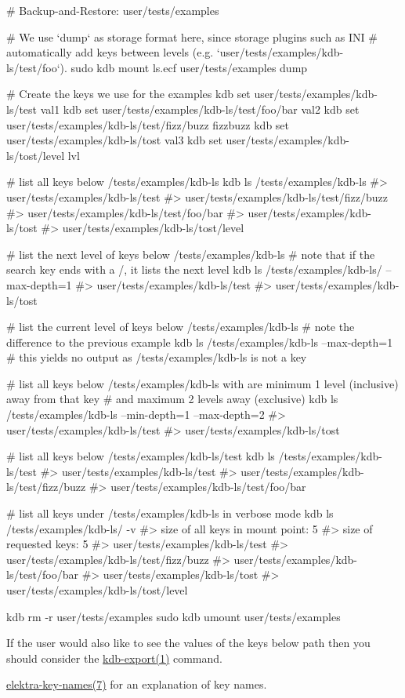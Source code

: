 \begin{DoxyCode}
# Backup-and-Restore: user/tests/examples

# We use `dump` as storage format here, since storage plugins such as INI
# automatically add keys between levels (e.g. `user/tests/examples/kdb-ls/test/foo`).
sudo kdb mount ls.ecf user/tests/examples dump

# Create the keys we use for the examples
kdb set user/tests/examples/kdb-ls/test val1
kdb set user/tests/examples/kdb-ls/test/foo/bar val2
kdb set user/tests/examples/kdb-ls/test/fizz/buzz fizzbuzz
kdb set user/tests/examples/kdb-ls/tost val3
kdb set user/tests/examples/kdb-ls/tost/level lvl

# list all keys below /tests/examples/kdb-ls
kdb ls /tests/examples/kdb-ls
#> user/tests/examples/kdb-ls/test
#> user/tests/examples/kdb-ls/test/fizz/buzz
#> user/tests/examples/kdb-ls/test/foo/bar
#> user/tests/examples/kdb-ls/tost
#> user/tests/examples/kdb-ls/tost/level

# list the next level of keys below /tests/examples/kdb-ls
# note that if the search key ends with a /, it lists the next level
kdb ls /tests/examples/kdb-ls/ --max-depth=1
#> user/tests/examples/kdb-ls/test
#> user/tests/examples/kdb-ls/tost

# list the current level of keys below /tests/examples/kdb-ls
# note the difference to the previous example
kdb ls /tests/examples/kdb-ls --max-depth=1
# this yields no output as /tests/examples/kdb-ls is not a key

# list all keys below /tests/examples/kdb-ls with are minimum 1 level (inclusive) away from that key
# and maximum 2 levels away (exclusive)
kdb ls /tests/examples/kdb-ls --min-depth=1 --max-depth=2
#> user/tests/examples/kdb-ls/test
#> user/tests/examples/kdb-ls/tost

# list all keys below /tests/examples/kdb-ls/test
kdb ls /tests/examples/kdb-ls/test
#> user/tests/examples/kdb-ls/test
#> user/tests/examples/kdb-ls/test/fizz/buzz
#> user/tests/examples/kdb-ls/test/foo/bar

# list all keys under /tests/examples/kdb-ls in verbose mode
kdb ls /tests/examples/kdb-ls/ -v
#> size of all keys in mount point: 5
#> size of requested keys: 5
#> user/tests/examples/kdb-ls/test
#> user/tests/examples/kdb-ls/test/fizz/buzz
#> user/tests/examples/kdb-ls/test/foo/bar
#> user/tests/examples/kdb-ls/tost
#> user/tests/examples/kdb-ls/tost/level

kdb rm -r user/tests/examples
sudo kdb umount user/tests/examples
\end{DoxyCode}



\begin{DoxyItemize}
\item If the user would also like to see the values of the keys below {\ttfamily path} then you should consider the \hyperlink{doc_help_kdb-export_md}{kdb-\/export(1)} command.
\item \hyperlink{doc_help_elektra-key-names_md}{elektra-\/key-\/names(7)} for an explanation of key names. 
\end{DoxyItemize}